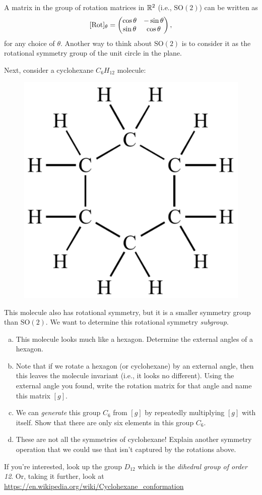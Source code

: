 \documentclass[12pt]{article} %
\begin{document}
\begin{problem}
A matrix in the group of rotation matrices in $\mathbb{R}^2$ (i.e., $\mathrm{SO}(2)$) can be written as
\[
[\mathrm{Rot}]_\theta = \begin{pmatrix} \cos \theta & - \sin \theta \\ \sin \theta & \cos \theta \end{pmatrix},
\]
for any choice of $\theta$. Another way to think about $\mathrm{SO}(2)$ is to consider it as the rotational symmetry group of the unit circle in the plane.

Next, consider a cyclohexane $C_6H_{12}$ molecule:
    \begin{figure}[H]
        \centering
        \includegraphics[width=.3\textwidth]{cyclohexane-500x500.png}
    \end{figure}
    \noindent This molecule also has rotational symmetry, but it is a smaller symmetry group than $\mathrm{SO}(2)$. We want to determine this rotational symmetry \emph{subgroup}.
\begin{enumerate}[(a)]
    \item This molecule looks much like a hexagon. Determine the external angles of a hexagon.
    \item Note that if we rotate a hexagon (or cyclohexane) by an external angle, then this leaves the molecule invariant (i.e., it looks no different). Using the external angle you found, write the rotation matrix for that angle and name this matrix $[g]$.
    \item We can \emph{generate} this group $C_6$ from $[g]$ by repeatedly multiplying $[g]$ with itself.  Show that there are only six elements in this group $C_6$.
    \item These are not all the symmetries of cyclohexane! Explain another symmetry operation that we could use that isn't captured by the rotations above.
\end{enumerate}
If you're interested, look up the group $D_{12}$ which is the \emph{dihedral group of order 12}. Or, taking it further, look at \url{https://en.wikipedia.org/wiki/Cyclohexane_conformation}
\end{problem}
\end{document}
